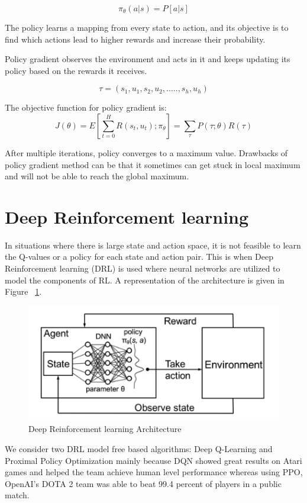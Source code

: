 \documentclass[12pt]{report}
\begin{document}
\[ \pi_\theta (a | s) = P [ a | s ] \]

The policy learns a mapping from every state to action, and its objective is to find which actions lead to higher rewards and increase their probability. 

Policy gradient observes the environment and acts in it and keeps updating its policy based on the rewards it receives. 

\[ \tau = (s_1, u_1, s_2, u_2, ....., s_h, u_h ) \]

The objective function for policy gradient is:
\[ J(\theta) = E[\sum_{t=0}^{H} R(s_t, u_t); \pi_\theta] = \sum_{\tau} P(\tau;\theta) R(\tau) \] 

After multiple iterations, policy converges to a maximum value. Drawbacks of policy gradient method can be that it sometimes can get stuck in local maximum and will not be able to reach the global maximum.  

\section{Deep Reinforcement learning}

In situations where there is large state and action space, it is not feasible to learn the Q-values or a policy for each state and action pair. This is when Deep Reinforcement learning (DRL) is used where neural networks are utilized to model the components of RL. A representation of the architecture is given in Figure ~\ref{fig:DRLArchitecture}. 

\begin{figure}[!h]
    \centering
    \includegraphics[width=12cm]{DRLArchitecture.png}
    \caption{Deep Reinforcement learning Architecture \cite{Mao}}
    \label{fig:DRLArchitecture}
\end{figure}


We consider two DRL model free based algorithms: Deep Q-Learning and Proximal Policy Optimization mainly because DQN showed great results on Atari games and helped the team achieve human level performance whereas using PPO, OpenAI's DOTA 2 team was able to beat 99.4 percent of players in a public match.  \\
\end{document}
